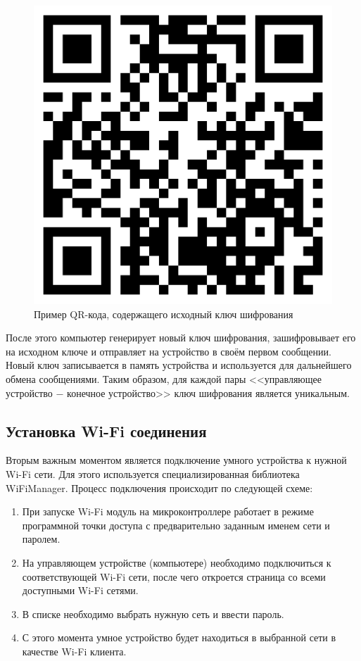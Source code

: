 	\begin{figure}[H]
		\centering
		\includegraphics[scale=0.15]{resources/private-key}
		\caption{Пример QR-кода, содержащего исходный ключ шифрования}
		\label{fig4.3}
	\end{figure}

	После этого компьютер генерирует новый ключ шифрования, зашифровывает его на исходном ключе
	и отправляет на устройство в своём первом сообщении. Новый ключ записывается в память устройства
	и используется для дальнейшего обмена сообщениями. Таким образом, для каждой пары 
	<<управляющее устройство $-$ конечное устройство>> ключ шифрования является уникальным.
	
	\subsection{Установка Wi-Fi соединения}
	
	Вторым важным моментом является подключение умного устройства к нужной Wi-Fi сети. Для этого
	используется специализированная библиотека WiFiManager. Процесс подключения происходит по 
	следующей схеме:
	
	\begin{enumerate}
		\item При запуске Wi-Fi модуль на микроконтроллере работает в режиме программной точки доступа
		с предварительно заданным именем сети и паролем.
		\item На управляющем устройстве (компьютере) необходимо подключиться к соответствующей Wi-Fi сети, 
		после чего откроется страница со всеми доступными Wi-Fi сетями.
		\item В списке необходимо выбрать нужную сеть и ввести пароль.
		\item С этого момента умное устройство будет находиться в выбранной сети в качестве Wi-Fi клиента.
	\end{enumerate}
	
